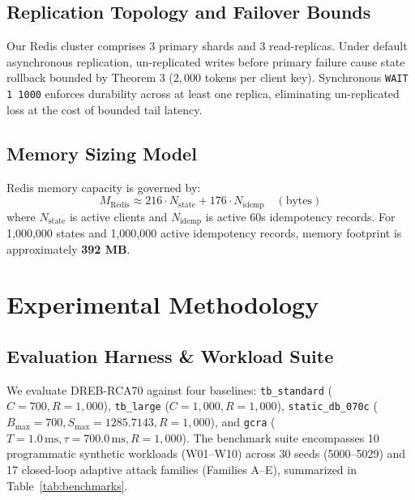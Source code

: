 \documentclass[conference]{IEEEtran}
\begin{document}
\subsection{Replication Topology and Failover Bounds}
Our Redis cluster comprises 3 primary shards and 3 read-replicas. Under default asynchronous replication, un-replicated writes before primary failure cause state rollback bounded by Theorem 3 ($2,000$ tokens per client key). Synchronous \texttt{WAIT 1 1000} enforces durability across at least one replica, eliminating un-replicated loss at the cost of bounded tail latency.

\subsection{Memory Sizing Model}
Redis memory capacity is governed by:
\begin{equation}
M_{\text{Redis}} \approx 216 \cdot N_{\text{state}} + 176 \cdot N_{\text{idemp}} \quad (\text{bytes})
\end{equation}
where $N_{\text{state}}$ is active clients and $N_{\text{idemp}}$ is active 60s idempotency records. For 1,000,000 states and 1,000,000 active idempotency records, memory footprint is approximately \textbf{392 MB}.

\section{Experimental Methodology}

\subsection{Evaluation Harness \& Workload Suite}
We evaluate DREB-RCA70 against four baselines: \texttt{tb\_standard} ($C=700, R=1,000$), \texttt{tb\_large} ($C=1,000, R=1,000$), \texttt{static\_db\_070c} ($B_{\max}=700, S_{\max}=1285.7143, R=1,000$), and \texttt{gcra} ($T=1.0\,\text{ms}, \tau=700.0\,\text{ms}, R=1,000$). The benchmark suite encompasses 10 programmatic synthetic workloads (W01--W10) across 30 seeds (5000--5029) and 17 closed-loop adaptive attack families (Families A--E), summarized in Table~\ref{tab:benchmarks}.
\end{document}

